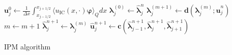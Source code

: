 \begin{algorithm}[H]
\begin{algorithmic}[1]
\State $\bm{u}_j^0 \leftarrow \frac{1}{\Delta x} \int_{x_{j-1/ 2}}^{x_{j+1/ 2}} \langle u_{\text{IC}}(x, \cdot) \bm{\varphi} \rangle_Q dx$
\EndFor
{}
\State $\bm{\lambda}_j^{(0)} \leftarrow \bm{\hat \lambda}_j^{n}$
\State $\bm{\lambda}_j^{(m+1)} \leftarrow \bm{d}(\bm{\lambda}_{j}^{(m)};\bm{\hat u}_j^{n})$
\State $m \leftarrow m+1$
\EndWhile
\State $\bm{\hat \lambda}_j^{n+1} \leftarrow \bm{\lambda}_j^{(m)}$
\EndFor
{}
\State $\bm{\hat u}_j^{n+1} \leftarrow \bm{c}(\bm{\hat \lambda}_{j-1}^{n+1},\bm{\hat \lambda}_j^{n+1},\bm{\hat \lambda}_{j+1}^{n+1})$
\EndFor
\EndFor
\end{algorithmic}
\caption{IPM algorithm}
\label{alg:IPM}
\end{algorithm}

